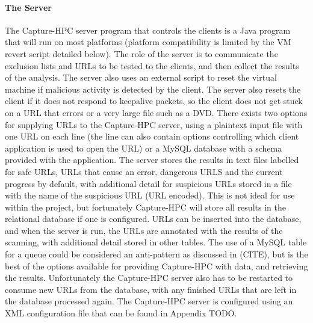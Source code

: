 \paragraph{The Server}
The Capture-HPC server program that controls the clients is a Java program that
will run on most platforms (platform compatibility is limited by the VM revert
script detailed below). The role of the server is to communicate the exclusion
lists and URLs to be tested to the clients, and then collect the results of the
analysis. The server also uses an external script to reset the virtual machine
if malicious activity is detected by the client. The server also resets the
client if it does not respond to keepalive packets, so the client does not get
stuck on a URL that errors or a very large file such as a DVD. There exists two
options for supplying URLs to the
Capture-HPC server, using a plaintext input file with one URL on each line (the
line can also contain options controlling which client application is used to
open the URL) or a MySQL database with a schema provided with the application.
The server stores the results in text files labelled for safe URLs, URLs that
cause an error, dangerous URLS and the current
progress by default, with additional detail for suspicious URLs stored in a file
with the name of the suspicious URL (URL encoded). This is not ideal for use within
the project, but fortunately Capture-HPC will store all results in the
relational database if one is configured. URLs can be inserted into the
database, and when the server is run, the URLs are annotated with the results of
the scanning, with additional detail stored in other tables.
The use of a MySQL table for a queue
could be considered an anti-pattern as discussed in (CITE), but is the best of
the options available for providing Capture-HPC with data, and retrieving the
results. Unfortunately the Capture-HPC server also has to be restarted to
consume new URLs from the database, with any finished URLs that are left in the
database processed again. The Capture-HPC server is configured using an XML
configuration file that can be found in Appendix TODO.
